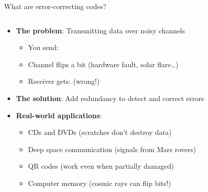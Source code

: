 \documentclass[aspectratio=169, lualatex, handout]{beamer}
\begin{document}
\begin{frame}{What are error-correcting codes?}
	\begin{columns}[c]
		\begin{column}{0.7\textwidth}
			\begin{itemize}
				\item \textbf{The problem}: Transmitting data over noisy channels
				      \begin{itemize}
					      \item You send: 
					      \item Channel flips a bit (hardware fault, solar flare\ldots)
					      \item Receiver gets:  (wrong!)
				      \end{itemize}
				\item \textbf{The solution}: Add redundancy to detect and correct errors
				\item \textbf{Real-world applications}:
				      \begin{itemize}
					      \item CDs and DVDs (scratches don't destroy data)
					      \item Deep space communication (signals from Mars rovers)
					      \item QR codes (work even when partially damaged)
					      \item Computer memory (cosmic rays can flip bits!)
				      \end{itemize}
			\end{itemize}
		\end{column}
		\begin{column}{0.3\textwidth}
		\end{column}
	\end{columns}

\end{frame}
\end{document}
